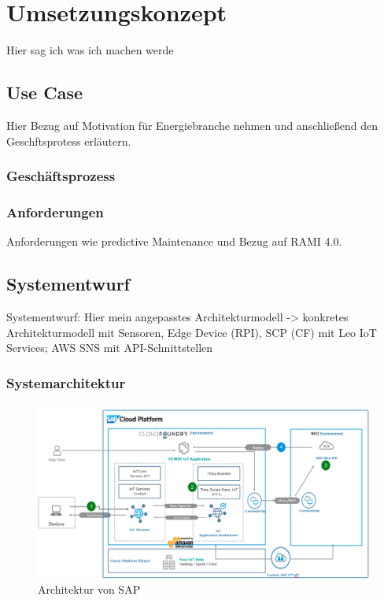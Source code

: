 \section{Umsetzungskonzept}
Hier sag ich was ich machen werde

\subsection{Use Case}

Hier Bezug auf Motivation für Energiebranche nehmen und anschließend den Geschftsprotess erläutern.

\subsubsection{Geschäftsprozess}

\subsubsection{Anforderungen}
Anforderungen wie predictive Maintenance und Bezug auf RAMI 4.0.
\subsection{Systementwurf}
Systementwurf: Hier mein angepasstes Architekturmodell -> konkretes Architekturmodell mit Sensoren, Edge Device (RPI), SCP (CF) mit Leo IoT Services; AWS SNS mit API-Schnittstellen

\subsubsection{Systemarchitektur}
\begin{figure}[H]
    \centering
    \includegraphics[width=1.0\linewidth]{pictures/sap_architecture}
    \caption[Referenzarchitektur von SAP]{Architektur von SAP \citep{Ganz2019}}
    \label{fig:filename_without_extension}
\end{figure}



